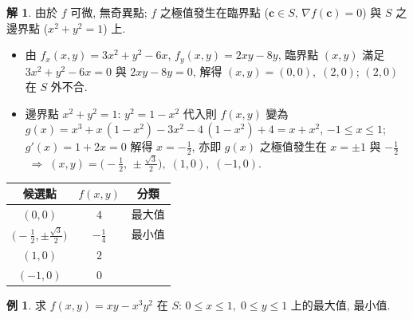 \documentclass[12pt]{extarticle}
\newcommand{\ds}{\displaystyle}
\newcommand{\ie}{\;\Longrightarrow\;}
\theoremstyle{definition}
\newtheorem*{ex}{例}
\newtheorem*{sol}{解}
\newcommand{\vc}{\mathbf{c}}
\begin{document}
\begin{sol}
  由於 $f$ 可微, 無奇異點; $f$ 之極值發生在臨界點 ($\vc\in S,\,\nabla f(\vc) = 0$) 與 $S$ 之邊界點 ($x^2 + y^2 = 1$) 上. 
  \begin{itemize}\setlength\itemsep{0em}
    \item 由 $\ds f_x(x, y) = 3x^2 + y^2 - 6x$, $\ds f_y(x, y) = 2xy - 8y$, 臨界點 $(x, y)$ 滿足 $\ds 3x^2 + y^2 - 6x = 0$ 與 $2xy - 8y = 0$, 解得 $(x, y) = (0, 0),\;(2, 0)$; $(2, 0)$ 在 $S$ 外不合. 
    \item 邊界點 $x^2 + y^2 = 1$: $y^2 = 1 - x^2$ 代入則 $f(x, y)$ 變為 $g(x) = x^3 + x\,(1 - x^2) - 3x^2 - 4\,(1 - x^2) + 4 = x + x^2$, $-1\leqslant x\leqslant 1$; $g'(x) = 1 + 2x = 0$ 解得 $x = -\frac{1}{2}$, 亦即 $g(x)$ 之極值發生在 $x = \pm 1$ 與 $-\frac{1}{2}$ $\ie (x, y) = \big(-\frac{1}{2},\,\pm\frac{\sqrt{3}}{2}\big),\;(1, 0),\;(-1, 0)$.  
  \end{itemize}
  \begin{center}
  \renewcommand{\arraystretch}{1.3}
  \begin{tabular}{ccc}
    \toprule
    候選點 & $f(x, y)$ & 分類 \\    
    \midrule
    $(0, 0)$  & $4$ & 最大值\\ 
    $\big(-\frac{1}{2}, \pm\frac{\sqrt{3}}{2}\big)$  & $-\frac{1}{4}$ & 最小值 \\ 
    $(1, 0)$  & $2$ &  \\ 
    $(-1, 0)$ & $0$ &  \\ \bottomrule
  \end{tabular}
  \renewcommand{\arraystretch}{1.0}
  \end{center}
\end{sol}

\begin{ex}
  求 $\ds f(x, y) = xy - x^3y^2$ 在 $S:\, 0\leqslant x\leqslant 1,\;0\leqslant y\leqslant 1$ 上的最大值, 最小值. 
\end{ex}
\end{document}
